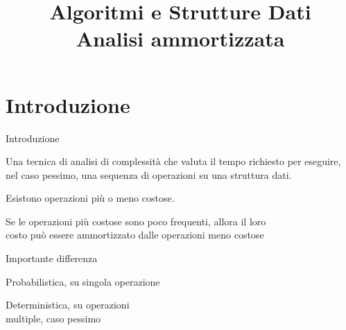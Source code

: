 

\graphicspath{{figs/02/}}



\title[ASD - Analisi ammortizzata]{\textbf{Algoritmi e Strutture Dati}\\[24pt]Analisi ammortizzata}

\FrameTitle{}

\FrameContent

\section{Introduzione}

\begin{frame}{Introduzione}

\begin{myboxtitle}
Una tecnica di analisi di complessità che valuta il tempo richiesto per eseguire, \alert{nel caso pessimo}, una sequenza di operazioni
su una struttura dati.
\BI
\item Esistono operazioni più o meno costose.
\item Se le operazioni più costose sono poco frequenti, allora il loro\\ costo può essere ammortizzato dalle operazioni
meno costose
\EI
\end{myboxtitle}

\bigskip
Importante differenza
\BI
\item {}
\parbox[t]{7cm}{Probabilistica, su singola operazione}
\item {}
\parbox[t]{7cm}{Deterministica, su operazioni\\ multiple, caso pessimo}
\EI

\end{frame}



